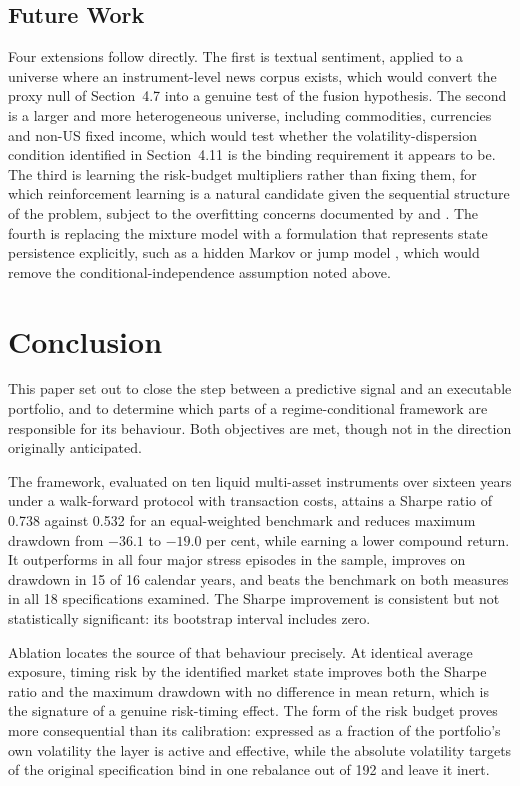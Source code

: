 \documentclass{singlecol-new}
\theoremstyle{TH}{
\newtheorem{lemma}{Lemma}
\newtheorem{theorem}[lemma]{Theorem}
\newtheorem{corrolary}[lemma]{Corrolary}
\newtheorem{conjecture}[lemma]{Conjecture}
\newtheorem{proposition}[lemma]{Proposition}
\newtheorem{claim}[lemma]{Claim}
\newtheorem{stheorem}[lemma]{Wrong Theorem}
\newtheorem{algorithm}{Algorithm}
}
\theoremstyle{THrm}{
\newtheorem{definition}{Definition}[section]
\newtheorem{question}{Question}[section]
\newtheorem{remark}{Remark}
\newtheorem{scheme}{Scheme}
}
\theoremstyle{THhit}{
\newtheorem{case}{Case}[section]
}
\begin{document}
\subsection{Future Work}

Four extensions follow directly. The first is textual sentiment, applied to a universe
where an instrument-level news corpus exists, which would convert the proxy null of
Section~4.7 into a genuine test of the fusion hypothesis. The second is a larger and
more heterogeneous universe, including commodities, currencies and non-US fixed income,
which would test whether the volatility-dispersion condition identified in
Section~4.11 is the binding requirement it appears to be. The third is learning the
risk-budget multipliers rather than fixing them, for which reinforcement learning is a
natural candidate given the sequential structure of the problem, subject to the
overfitting concerns documented by \citet{harvey15} and \citet{valls26}. The fourth is
replacing the mixture model with a formulation that represents state persistence
explicitly, such as a hidden Markov or jump model \citep{li25}, which would remove the
conditional-independence assumption noted above.

\section{Conclusion}
\label{sec:conclusion}

This paper set out to close the step between a predictive signal and an executable
portfolio, and to determine which parts of a regime-conditional framework are
responsible for its behaviour. Both objectives are met, though not in the direction
originally anticipated.

The framework, evaluated on ten liquid multi-asset instruments over sixteen years under
a walk-forward protocol with transaction costs, attains a Sharpe ratio of 0.738 against
0.532 for an equal-weighted benchmark and reduces maximum drawdown from $-36.1$ to
$-19.0$ per cent, while earning a lower compound return. It outperforms in all four
major stress episodes in the sample, improves on drawdown in 15 of 16 calendar years,
and beats the benchmark on both measures in all 18 specifications examined. The Sharpe
improvement is consistent but not statistically significant: its bootstrap interval
includes zero.

Ablation locates the source of that behaviour precisely. At identical average exposure,
timing risk by the identified market state improves both the Sharpe ratio and the
maximum drawdown with no difference in mean return, which is the signature of a genuine
risk-timing effect. The form of the risk budget proves more consequential than its
calibration: expressed as a fraction of the portfolio's own volatility the layer is
active and effective, while the absolute volatility targets of the original
specification bind in one rebalance out of 192 and leave it inert.
\end{document}

